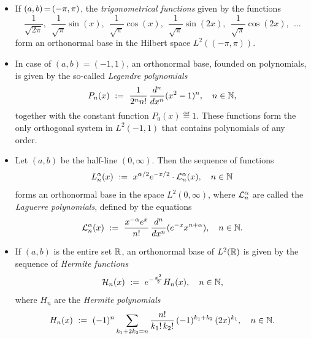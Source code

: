\documentclass[11pt,twoside]{article}
\begin{document}
\begin{itemize}[leftmargin=15pt,itemsep=6pt]
\item[1.]
If $(a,b) \eq (-\pi,\pi)$,
the \textit{trigonometrical functions} given by the functions
\[
\frac{1}{\sqrt{2\pi}},         \;\,
\frac{1}{\sqrt{\pi}} \sin(x),  \;\,
\frac{1}{\sqrt{\pi}} \cos(x),  \;\,
\frac{1}{\sqrt{\pi}} \sin(2x), \;\,
\frac{1}{\sqrt{\pi}} \cos(2x), \;\, \dots
\]
form an orthonormal base in the Hilbert space $L^2((-\pi,\pi))$.

\item[2.]
In case of $(a,b)=(-1,1)$,
an orthonormal base, founded on polynomials,
is given by the so-called \textit{Legendre polynomials}
\[
P_n(x)
\, \eqdef \,
\frac{1}{2^n n!} \, \frac{d^n}{dx^n} (x^2-1)^n,
\quad n \in \N,
\]
together with the constant function $P_0(x) \eqdef 1$.
These functions form the only orthogonal system in $L^2(-1,1)$
that contains polynomials of any order.

\item[3.]
Let $(a,b)$ be the half-line $(0,\infty)$.
Then the sequence of functions
\[
L_n^{\alpha}(x)
\, \eqdef \,
x^{\alpha/2} e^{-x/2}
\cdot
\cal{L}_n^{\alpha}(x),
\quad n \in \N
\]
forms an orthonormal base in the space $L^2(0,\infty)$,
where $\cal{L}_n^{\alpha}$ are called the \textit{Laguerre polynomials},
defined by the equations
\[
\cal{L}_n^{\alpha}(x)
\, \eqdef \,
\frac{x^{-\alpha}e^x}{n!} \, \frac{d^n}{dx^n} (e^{-x}x^{n+\alpha}),
\quad n \in \N.
\]

\item[4.]
If $(a,b)$ is the entire set $\R$,
an orthonormal base of $L^2(\R)$ is given by the sequence
of \textit{Hermite functions}
\[
\cal{H}_n(x) \, \eqdef \, e^{-\frac{x^2}{2}} H_n(x),
\quad n \in \N,
\]
where $H_n$ are the \textit{Hermite polynomials}
\[
{H}_n(x)
\, \eqdef \,
(-1)^n \sum_{k_1+2k_2=n}
\frac{n!}{k_1! \, k_2!}
\,
(-1)^{k_1+k_2} \, (2x)^{k_1},
\quad n \in \N.
\]

\end{itemize}
\end{document}
